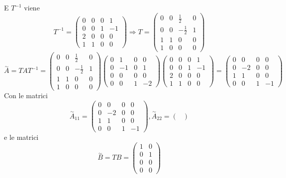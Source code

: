 \documentclass{article}
\begin{document}
E $T^{-1}$ viene \[ T^{-1} = \left(\begin{matrix}0 & 0 & 0 & 1\\0 & 0 & 1 & -1\\2 & 0 & 0 & 0\\1 & 1 & 0 & 0\end{matrix}\right) \Longrightarrow T = \left(\begin{matrix}0 & 0 & \frac{1}{2} & 0\\0 & 0 & - \frac{1}{2} & 1\\1 & 1 & 0 & 0\\1 & 0 & 0 & 0\end{matrix}\right) \]
\[ \overset{\sim}{A} = T A  T^{-1} = \left(\begin{matrix}0 & 0 & \frac{1}{2} & 0\\0 & 0 & - \frac{1}{2} & 1\\1 & 1 & 0 & 0\\1 & 0 & 0 & 0\end{matrix}\right)\left(\begin{matrix}0 & 1 & 0 & 0\\0 & -1 & 0 & 1\\0 & 0 & 0 & 0\\0 & 0 & 1 & -2\end{matrix}\right)\left(\begin{matrix}0 & 0 & 0 & 1\\0 & 0 & 1 & -1\\2 & 0 & 0 & 0\\1 & 1 & 0 & 0\end{matrix}\right) = \left(\begin{matrix}0 & 0 & 0 & 0\\0 & -2 & 0 & 0\\1 & 1 & 0 & 0\\0 & 0 & 1 & -1\end{matrix}\right) \]Con le matrici \[ \overset{\sim}{A}_{11} = \left(\begin{matrix}0 & 0 & 0 & 0\\0 & -2 & 0 & 0\\1 & 1 & 0 & 0\\0 & 0 & 1 & -1\end{matrix}\right) , \overset{\sim}{A}_{22} = \left(\begin{matrix}\end{matrix}\right)  \]e le matrici \[ \overset{\sim}{B} = TB = \left(\begin{matrix}1 & 0\\0 & 1\\0 & 0\\0 & 0\end{matrix}\right)  \]
\end{document}
